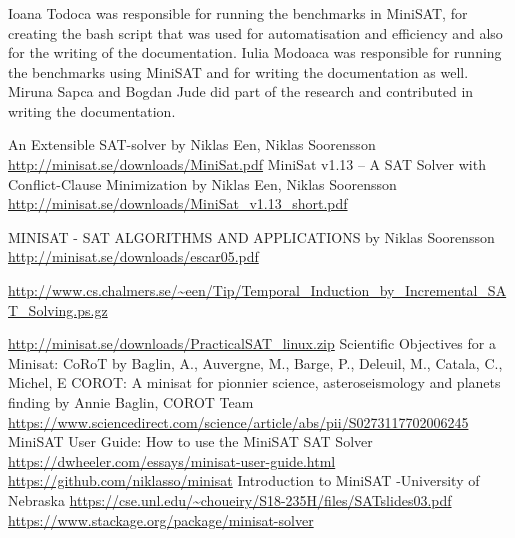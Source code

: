 \documentclass[runningheads]{llncs}
\begin{document}
\begin{credits}
\subsubsection{\ackname} Ioana Todoca was responsible for running the benchmarks in MiniSAT, for creating the bash script that was used for automatisation and efficiency and also for the writing of the documentation. Iulia Modoaca was responsible for running the benchmarks using MiniSAT and for writing the documentation as well. Miruna Sapca and Bogdan Jude did part of the research and contributed in writing the documentation.

\end{credits}
%
%
%
% 
% 
%
\begin{thebibliography}{8}
An Extensible SAT-solver by Niklas Een, Niklas Soorensson
\url{http://minisat.se/downloads/MiniSat.pdf}
MiniSat v1.13 – A SAT Solver with Conflict-Clause
Minimization by Niklas Een, Niklas Soorensson
\url{http://minisat.se/downloads/MiniSat_v1.13_short.pdf}

MINISAT - SAT ALGORITHMS AND APPLICATIONS by Niklas Soorensson \url{http://minisat.se/downloads/escar05.pdf}

\url{http://www.cs.chalmers.se/~een/Tip/Temporal_Induction_by_Incremental_SAT_Solving.ps.gz}

\url{http://minisat.se/downloads/PracticalSAT_linux.zip}
Scientific Objectives for a Minisat: CoRoT by  Baglin, A., Auvergne, M., Barge, P., Deleuil, M., Catala, C., Michel, E 
COROT: A minisat for pionnier science, asteroseismology and planets finding by Annie Baglin, 
COROT Team
\url{https://www.sciencedirect.com/science/article/abs/pii/S0273117702006245}
MiniSAT User Guide: How to use the MiniSAT SAT Solver
\url{https://dwheeler.com/essays/minisat-user-guide.html}
\url{https://github.com/niklasso/minisat}
Introduction to	MiniSAT -University of Nebraska 
\url{https://cse.unl.edu/~choueiry/S18-235H/files/SATslides03.pdf}
\url{https://www.stackage.org/package/minisat-solver}


\end{thebibliography}
\end{document}
